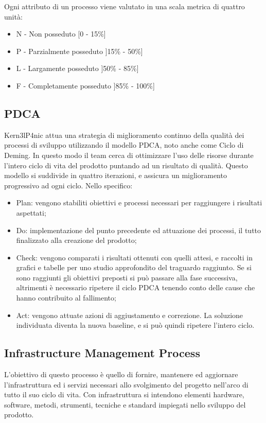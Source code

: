 \documentclass[../PianoDiQualifica.tex]{subfiles}
\begin{document}
			Ogni attributo di un processo viene valutato in una scala metrica di quattro unità:
			\begin{itemize}
				\item N - Non posseduto [0 - 15\%]
				\item P - Parzialmente posseduto ]15\% - 50\%]
				\item L - Largamente posseduto ]50\% - 85\%]
				\item F - Completamente posseduto ]85\% - 100\%]
			\end{itemize}
			
		\subsection{PDCA}
		Kern3lP4nic attua una strategia di miglioramento continuo della qualità dei processi di sviluppo utilizzando il modello PDCA, noto anche come Ciclo di Deming. In questo modo il team cerca di ottimizzare l'uso delle risorse durante l'intero ciclo di vita del prodotto puntando ad un risultato di qualità. Questo modello si suddivide in quattro iterazioni, e assicura un miglioramento progressivo ad ogni ciclo. Nello specifico: 
			\begin{itemize}
				\item Plan: vengono stabiliti obiettivi e processi necessari per raggiungere i risultati aspettati;
				\item Do: implementazione del punto precedente ed attuazione dei processi, il tutto finalizzato alla creazione del prodotto;
				\item Check: vengono comparati i risultati ottenuti con quelli attesi, e raccolti in grafici e tabelle per uno studio approfondito del traguardo raggiunto. Se si sono raggiunti gli obiettivi preposti si può passare alla fase successiva, altrimenti è necessario ripetere il ciclo PDCA tenendo conto delle cause che hanno contribuito al fallimento;
				\item Act: vengono attuate azioni di aggiustamento e correzione. La soluzione individuata diventa la nuova baseline, e si può quindi ripetere l'intero ciclo.
			\end{itemize}
			
		\subsection{Infrastructure Management Process}
		L'obiettivo di questo processo è quello di fornire, mantenere ed aggiornare l'infrastruttura ed i servizi necessari allo svolgimento del progetto nell'arco di tutto il suo ciclo di vita. Con infrastruttura si intendono elementi hardware, software, metodi, strumenti, tecniche e standard impiegati nello sviluppo del prodotto.
		
\end{document}
